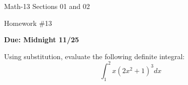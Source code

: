 \documentclass[letterpaper,12pt,fleqn]{article}
\begin{document}
\begin{center}
  \large
  Math-13 Sections 01 and 02

  \Large
  Homework \#13

  \large
  \textbf{Due: Midnight 11/25}
\end{center}

\vspace{0.5in}

Using substitution, evaluate the following definite integral:
\[\int_1^2x(2x^2+1)^3dx\]
\end{document}
